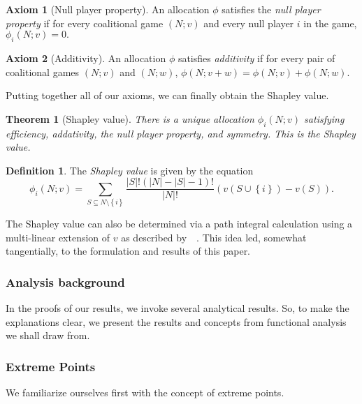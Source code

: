 \documentclass[12pt,letterpaper,final]{article}
\theoremstyle{plain}
\newtheorem{theorem}{Theorem}[section]
\theoremstyle{plain}
\theoremstyle{plain}
\theoremstyle{plain}
\theoremstyle{plain}
\theoremstyle{plain}
\theoremstyle{plain}
\theoremstyle{definition}
\newtheorem{definition}{Definition}[section]
\theoremstyle{definition}
\theoremstyle{definition}
\theoremstyle{definition}
\theoremstyle{definition}
\newtheorem{axiom}{Axiom}[section]
\theoremstyle{remark}
\theoremstyle{remark}
\theoremstyle{remark}
\theoremstyle{remark}
\begin{document}
\begin{axiom}[Null player property]\label{ax:npp}
  An allocation \(\phi\) satisfies the \emph{null player property}
  if 
  for every coalitional game \((N;v)\) and every null player \(i\)
  in the game,
  \(\phi_i(N;v) = 0.\)
\end{axiom}

\begin{axiom}[Additivity]\label{ax:add}
  An allocation \(\phi\) satisfies \emph{additivity} if for every 
  pair of coalitional games \((N;v)\) and \((N;w)\),
  \(\phi(N;v+w) = \phi(N;v)+ \phi(N;w)\).
\end{axiom}



Putting together all of our axioms, we can finally obtain the Shapley
value. 

\begin{theorem}[Shapley value]
  There is a unique allocation \(\phi_i(N;v)\) satisfying efficiency, addativity, the
  null player property, and symmetry. 
  This is the Shapley value.
\end{theorem}

\begin{definition}
  The \emph{Shapley value} is given by the equation
  \[
    \phi_i(N;v) = \sum_{S\subseteq N\setminus\left\{i\right\}}
    \frac{|S|! (|N|-|S| - 1)!}{|N|!}\left(v(S\cup \left\{i\right\}) -
      v(S)\right).
  \]
\end{definition}


The Shapley value can also be determined via a path integral
calculation using a multi-linear extension of \(v\) as described
by~\citeauthor{Owen72}~\cite{Owen72}. This idea led, somewhat
tangentially, to the formulation and results of this paper.


\subsubsection{Analysis background}

In the proofs of our results, we invoke several analytical results. So,
to make the explanations clear, we present the results and
concepts from functional analysis we shall draw from.

\subsubsection{Extreme Points}

We familiarize ourselves first with the concept of extreme points.
\end{document}
